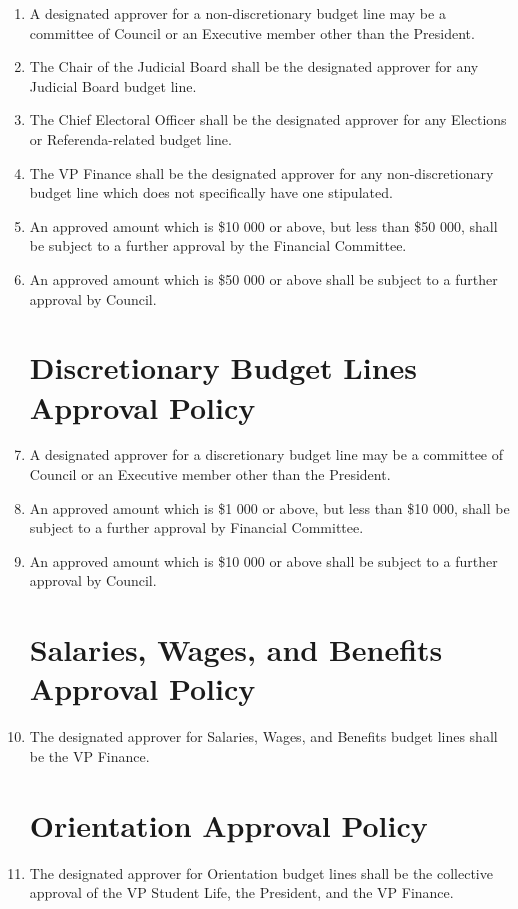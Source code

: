 \documentclass[oneside]{book}
\begin{document}
\begin{enumerate}
\item A designated approver for a non-discretionary budget line may be a committee of Council or an Executive member other than the President. 
\item The Chair of the Judicial Board shall be the designated approver for any Judicial Board budget line.
\item The Chief Electoral Officer shall be the designated approver for any Elections or Referenda-related budget line.
\item The VP Finance shall be the designated approver for any non-discretionary budget line which does not specifically have one stipulated.
\item An approved amount which is \$10 000 or above, but less than \$50 000, shall be subject to a further approval by the Financial Committee.
\item An approved amount which is \$50 000 or above shall be subject to a further approval by Council.

\section{\label{Discretionary_Budget_Lines_Approval_Policy}Discretionary Budget Lines Approval Policy}
\item A designated approver for a discretionary budget line may be a committee of Council or an Executive member other than the President.
\item An approved amount which is \$1 000 or above, but less than \$10 000, shall be subject to a further approval by Financial Committee.
\item An approved amount which is \$10 000 or above shall be subject to a further approval by Council.
\section{\label{Salaries_Wages_and_Benefits_Approval_Policy}Salaries, Wages, and Benefits Approval Policy}
\item The designated approver for Salaries, Wages, and Benefits budget lines shall be the VP Finance.
\section{\label{Orientation_Approval_Policy}Orientation Approval Policy}
\item The designated approver for Orientation budget lines shall be the collective approval of the VP Student Life, the President, and the VP Finance.

\end{enumerate}
\end{document}
